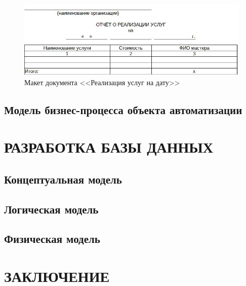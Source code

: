 \documentclass[12pt, a4paper, simple]{eskdtext}
\begin{document}
    \begin{figure}[!h]
        \centering
        \includegraphics[width=14cm]
            {_docs/ОТ_РеализУслНаДату_макет.jpg}
        \caption{Макет документа <<Реализация услуг на дату>>}
        \label{fig:OT_RealizYslNaDaty_maket}
    \end{figure}

    \newpage
    
    \subsection{Модель бизнес-процесса объекта автоматизации}
    \newpage

    \section{РАЗРАБОТКА БАЗЫ ДАННЫХ}
    \subsection{Концептуальная модель}
    \subsection{Логическая модель}
    \subsection{Физическая модель}
    \newpage

    \newpage
    \section*{ЗАКЛЮЧЕНИЕ}
    \newpage

    \newpage
\end{document}
